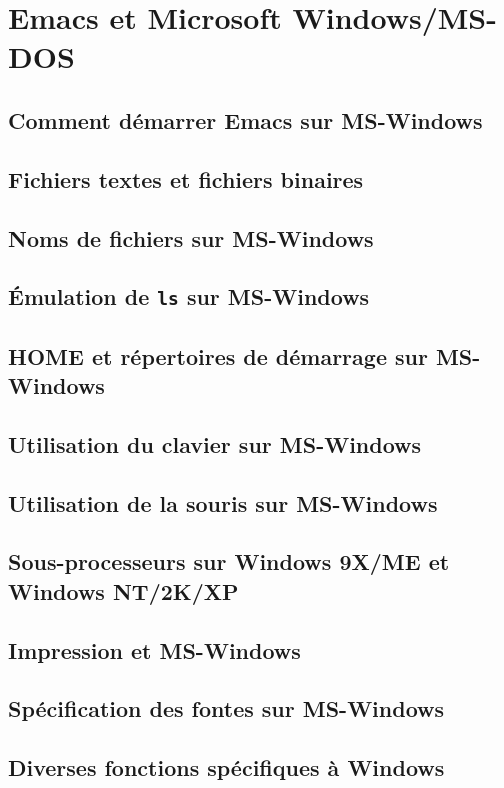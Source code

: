 \chapter{Emacs et Microsoft Windows/MS-DOS}\label{appG}
\section{Comment démarrer Emacs sur MS-Windows}\label{appGsec1}
\section{Fichiers textes et fichiers binaires}\label{appGsec2}
\section{Noms de fichiers sur MS-Windows}\label{appGsec3}
\section{\'Emulation de \texttt{ls} sur MS-Windows}\label{appGsec4}
\section{HOME et répertoires de démarrage sur
  MS-Windows}\label{appGsec5} 
\section{Utilisation du clavier sur MS-Windows}\label{appGsec6}
\section{Utilisation de la souris sur MS-Windows}\label{appGsec7}
\section{Sous-processeurs sur Windows 9X/ME et Windows
  NT/2K/XP}\label{appGsec8} 
\section{Impression et MS-Windows}\label{appGsec9}
\section{Spécification des fontes sur MS-Windows}\label{appGsec10}
\section{Diverses fonctions spécifiques à Windows}\label{appGsec11}
